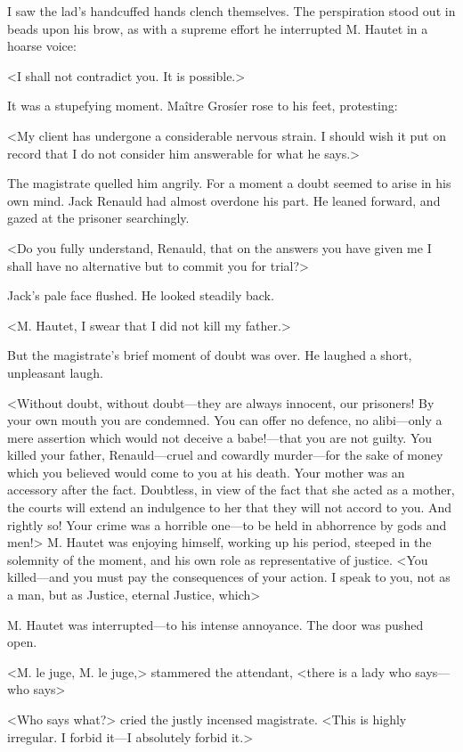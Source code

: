  I saw the lad's handcuffed hands clench themselves. The perspiration stood out in beads upon his brow, as with a supreme effort he interrupted M. Hautet in a hoarse voice: 

 <I shall not contradict you. It is possible.> 

 It was a stupefying moment. Maître Grosíer rose to his feet, protesting: 

 <My client has undergone a considerable nervous strain. I should wish it put on record that I do not consider him answerable for what he says.> 

 The magistrate quelled him angrily. For a moment a doubt seemed to arise in his own mind. Jack Renauld had almost overdone his part. He leaned forward, and gazed at the prisoner searchingly. 

 <Do you fully understand, Renauld, that on the answers you have given me I shall have no alternative but to commit you for trial?> 

 Jack's pale face flushed. He looked steadily back. 

 <M. Hautet, I swear that I did not kill my father.> 

 But the magistrate's brief moment of doubt was over. He laughed a short, unpleasant laugh. 

 <Without doubt, without doubt—they are always innocent, our prisoners! By your own mouth you are condemned. You can offer no defence, no alibi—only a mere assertion which would not deceive a babe!—that you are not guilty. You killed your father, Renauld—cruel and cowardly murder—for the sake of money which you believed would come to you at his death. Your mother was an accessory after the fact. Doubtless, in view of the fact that she acted as a mother, the courts will extend an indulgence to her that they will not accord to you. And rightly so! Your crime was a horrible one—to be held in abhorrence by gods and men!> M. Hautet was enjoying himself, working up his period, steeped in the solemnity of the moment, and his own role as representative of justice. <You killed—and you must pay the consequences of your action. I speak to you, not as a man, but as Justice, eternal Justice, which\longdash> 

 M. Hautet was interrupted—to his intense annoyance. The door was pushed open. 

 <M. le juge, M. le juge,> stammered the attendant, <there is a lady who says—who says\longdash> 

 <Who says what?> cried the justly incensed magistrate. <This is highly irregular. I forbid it—I absolutely forbid it.> 

